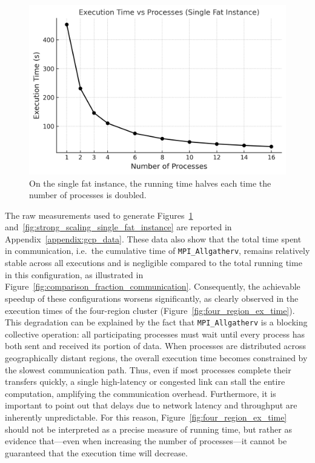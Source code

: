 \documentclass{article}
\begin{document}
\begin{figure}[H]
    \centering
    \includegraphics[width=0.8\linewidth]{single_fat_instance_ex_time.png}
    \caption{On the single fat instance, the running time halves each time the number of processes is doubled.}
    \label{fig:single_fat_instance_ex_time}
\end{figure}

The raw measurements used to generate Figures~\ref{fig:single_fat_instance_ex_time} and~\ref{fig:strong_scaling_single_fat_instance} are reported in Appendix~\ref{appendix:gcp_data}.  
These data also show that the total time spent in communication, i.e.\ the cumulative time of \texttt{MPI\_Allgatherv}, remains relatively stable across all executions and is negligible compared to the total running time in this configuration, as illustrated in Figure~\ref{fig:comparison_fraction_communication}. 
Consequently, the achievable speedup of these configurations worsens significantly, as clearly observed in the execution times of the four-region cluster (Figure~\ref{fig:four_region_ex_time}).
This degradation can be explained by the fact that \texttt{MPI\_Allgatherv} is a blocking collective operation: all participating processes must wait until every process has both sent and received its portion of data.
When processes are distributed across geographically distant regions, the overall execution time becomes constrained by the slowest communication path. Thus, even if most processes complete their transfers quickly, a single high-latency or congested link can stall the entire computation, amplifying the communication overhead. Furthermore, it is important to point out that delays due to network latency and throughput are inherently unpredictable. For this reason, Figure~\ref{fig:four_region_ex_time} should not be interpreted as a precise measure of running time, but rather as evidence that—even when increasing the number of processes—it cannot be guaranteed that the execution time will decrease.
\end{document}

